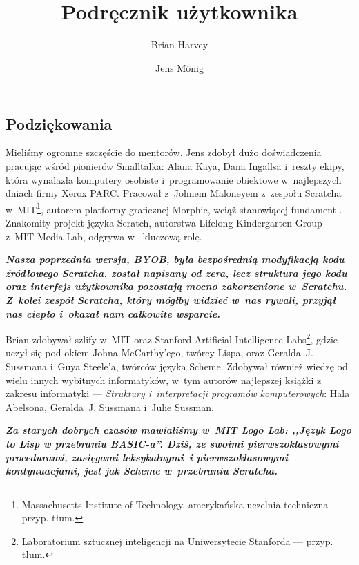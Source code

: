 \documentclass{report}
\begin{document}
\title{\Snap{} \\ Podręcznik użytkownika}
\author{Brian Harvey \and Jens M\"{o}nig}
\date{}

\maketitle

\tableofcontents

\chapter*{}
\section*{Podziękowania}

Mieliśmy ogromne szczęście do mentorów. Jens zdobył dużo doświadczenia pracując wśród pionierów Smalltalka: Alana Kaya, Dana Ingallsa i~reszty ekipy, która wynalazła komputery osobiste i~programowanie obiektowe w~najlepszych dniach firmy Xerox PARC. Pracował z~Johnem Maloneyem z~zespołu Scratcha w~MIT\footnote{Massachusetts Institute of Technology, amerykańska uczelnia techniczna --- przyp. tłum.}, autorem platformy graficznej Morphic, wciąż stanowiącej fundament . Znakomity projekt języka Scratch, autorstwa Lifelong Kindergarten Group z~MIT Media Lab, odgrywa w~ kluczową rolę.

\textbf{\emph{Nasza poprzednia wersja, BYOB, była bezpośrednią modyfikacją kodu źródłowego Scratcha. \Snap{} został napisany od zera, lecz struktura jego kodu oraz interfejs użytkownika pozostają mocno zakorzenione w~Scratchu. Z~kolei zespół Scratcha, który mógłby widzieć w~nas rywali, przyjął nas ciepło i~okazał nam całkowite wsparcie.}}

Brian zdobywał szlify w~MIT oraz Stanford Artificial Intelligence Labs\footnote{Laboratorium sztucznej inteligencji na Uniwersytecie Stanforda --- przyp. tłum.}, gdzie uczył się pod okiem Johna McCarthy'ego, twórcy Lispa, oraz Geralda~J. Suss\-mana i~Guya Steele'a, twórców języka Scheme. Zdobywał również wiedzę od wielu innych wybitnych informatyków, w~tym autorów najlepszej książki z zakresu informatyki --- \emph{Struktury i~interpretacji programów komputerowych}: Hala Abelsona, Geralda~J. Suss\-mana i~Julie Suss\-man.

\textbf{\emph{Za starych dobrych czasów mawialiśmy w~MIT Logo Lab: ,,Język Logo to Lisp w przebraniu BASIC-a''. Dziś, ze swoimi pierwszoklasowymi procedurami, zasięgami leksykalnymi~i pierwszoklasowymi kontynuacjami, \Snap{} jest jak Scheme w~przebraniu Scratcha.}}
\end{document}
